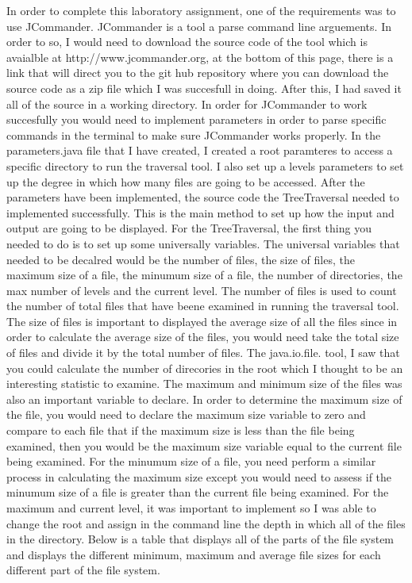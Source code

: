 \documentclass{article}
\begin{document}
In order to complete this laboratory assignment, one of the requirements was to use JCommander. JCommander is a tool a parse command line arguements. In order to so, I would need to download the source code of the tool which is avaialble at http://www.jcommander.org, at the bottom of this page, there is a link that will direct you to the git hub repository where you can download the source code as a zip file which I was succesfull in doing. After this, I had saved it all of the source in a working directory. In order for JCommander to work succesfully you would need to implement parameters in order to parse specific commands in the terminal to make sure JCommander works properly. In the parameters.java file that I have created, I created a root paramteres to access a specific directory to run the traversal tool. I also set up a levels parameters to set up the degree in which how many files are going to be accessed. After the parameters have been implemented, the source code the TreeTraversal needed to implemented successfully. This is the main method to set up how the input and output are going to be displayed. For the TreeTraversal, the first thing you needed to do is to set up some universally variables. The universal variables that needed to be decalred would be the number of files, the size of files, the maximum size of a file, the minumum size of a file, the number of directories, the max number of levels and the current level. The number of files is used to count the number of total files that have beene examined in running the traversal tool. The size of files is important to displayed the average size of all the files since in order to calculate the average size of the files, you would need take the total size of files and divide it by the total number of files. The java.io.file. tool, I saw that you could calculate the number of direcories in the root which I thought to be an interesting statistic to examine. The maximum and minimum size of the files was also an important variable to declare. In order to determine the maximum size of the file, you would need to declare the maximum size variable to zero and compare to each file that if the maximum size is less than the file being examined, then you would be the maximum size variable equal to the current file being examined. For the minumum size of a file, you need perform a similar process in calculating the maximum size except you would need to assess if the minumum size of a file is greater than the current file being examined. For the maximum and current level, it was important to implement so I was able to change the root and assign in the command line the depth in which all of the files in the directory. Below is a table that displays all of the parts of the file system and displays the different minimum, maximum and average file sizes for each different part of the file system.
\end{document}
